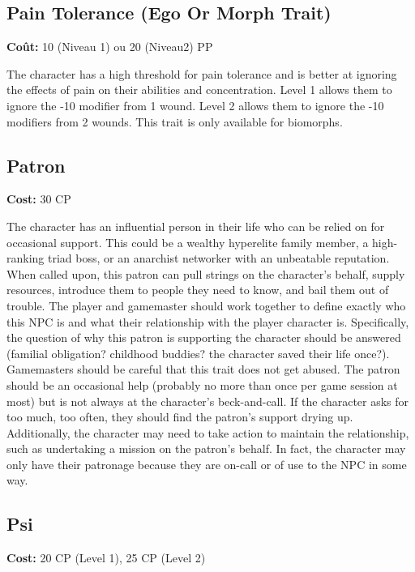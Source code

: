 \subsection{Pain Tolerance (Ego Or Morph Trait)} \label{sec:traits-pain-tolerance} 

\textbf{Coût:} 10 (Niveau 1) ou 20 (Niveau2) PP 

The character has a high threshold for pain tolerance and is better at ignoring the effects of pain on their abilities and concentration. Level 1 allows them to ignore the -10 modifier from 1 wound. Level 2 allows them to ignore the -10 modifiers from 2 wounds. This trait is only available for biomorphs. 

\subsection{Patron} \label{sec:traits-patron} 

\textbf{Cost:} 30 CP 

The character has an influential person in their life who can be relied on for occasional support. This could be a wealthy hyperelite family member, a high-ranking triad boss, or an anarchist networker with an unbeatable reputation. When called upon, this patron can pull strings on the character’s behalf, supply resources, introduce them to people they need to know, and bail them out of trouble. The player and gamemaster should work together to define exactly who this NPC is and what their relationship with the player character is. Specifically, the question of why this patron is supporting the character should be answered (familial obligation? childhood buddies? the character saved their life once?). Gamemasters should be careful that this trait does not get abused. The patron should be an occasional help (probably no more than once per game session at most) but is not always at the character’s beck-and-call. If the character asks for too much, too often, they should find the patron’s support drying up. Additionally, the character may need to take action to maintain the relationship, such as undertaking a mission on the patron’s behalf. In fact, the character may only have their patronage because they are on-call or of use to the NPC in some way. 

\subsection{Psi} \label{sec:traits-psi} \textbf{Cost:} 20 CP (Level 1), 25 CP (Level 2) 

